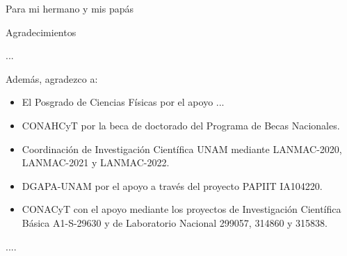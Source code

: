 \begin{dedicatoria}
Para mi hermano y mis papás
\end{dedicatoria}

\begin{agradecimientos}%
Agradecimientos

\medskip

...

\medskip

Además, agradezco a:

\begin{itemize}
\item El Posgrado de Ciencias Físicas por el apoyo ...
\item CONAHCyT por la beca de doctorado del Programa de Becas Nacionales.
\item Coordinación de Investigación Científica UNAM mediante LANMAC-2020, LANMAC-2021 y LANMAC-2022.
\item DGAPA-UNAM por el apoyo a través del proyecto PAPIIT IA104220.
\item CONACyT con el apoyo mediante los proyectos de Investigación Científica Básica A1-S-29630 y de Laboratorio Nacional 299057, 314860 y 315838.
\end{itemize}

\end{agradecimientos}

\begin{resumen}
....
\end{resumen}

\begin{abstract}
...
\end{abstract}
